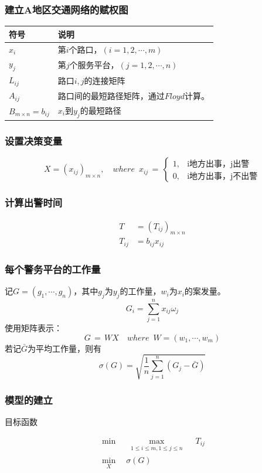 \subsubsection{建立A地区交通网络的赋权图}
\begin{table}[h]
\begin{tabular}{ll}
\hline
符号 & 说明 \\ \hline
$x_i$ & 第$i$个路口，$(i=1,2,\cdots,m)$ \\
$y_j$ & 第$j$个服务平台，$(j=1,2,\cdots,n)$ \\
$L_{ij}$ & 路口$i,j$的连接矩阵 \\
$A_{ij}$ & 路口间的最短路径矩阵，通过$Floyd$计算。 \\
$B_{m\times n}=b_{ij}$ & $x_i$到$y_j$的最短路径 \\ \hline
\end{tabular}
\end{table}
\subsubsection{设置决策变量}
\begin{equation*}
X=(x_{ij})_{m\times n},\quad where\,\,\,x_{ij}\,=\,
\begin{cases}
1, & \text{i地方出事，j出警}\\
0, & \text{i地方出事，j不出警}
\end{cases}
\end{equation*}
\subsubsection{计算出警时间}
\begin{align}
T &=(T_{ij})_{m\times n} \\
T_{ij} &=b_{ij}x_{ij}
\end{align}
\subsubsection{每个警务平台的工作量}
记$G=(g_1,\cdots,g_n)$，其中$g_j$为$y_j$的工作量，$w_i$为$x_i$的案发量。
$$G_i = \sum_{j=1}^{n}x_{ij}\omega_{j}$$
使用矩阵表示：
$$G\,=\,W X\quad where\,\,\,W = (w_1,\cdots,w_m)$$
若记$\bar{G}$为平均工作量，则有
$$\sigma(G)=\sqrt{\frac{1}{n}\sum_{j=1}^{n}(G_j-\bar{G})}$$
\subsubsection{模型的建立}
{\heiti 目标函数}\par
\begin{align*}
\min\quad\max_{\substack{1\leq i\leq m, 1\leq j\leq n}}\quad T_{ij} \\
\min_{X}\quad\sigma(G)
\end{align*}

